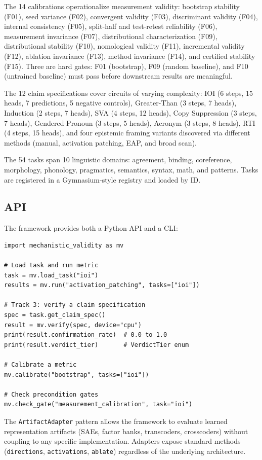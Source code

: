 \documentclass[10pt]{article}
\begin{document}
The 14 calibrations operationalize measurement validity: bootstrap stability (F01), seed variance (F02), convergent validity (F03), discriminant validity (F04), internal consistency (F05), split-half and test-retest reliability (F06), measurement invariance (F07), distributional characterization (F09), distributional stability (F10), nomological validity (F11), incremental validity (F12), ablation invariance (F13), method invariance (F14), and certified stability (F15). Three are hard gates: F01 (bootstrap), F09 (random baseline), and F10 (untrained baseline) must pass before downstream results are meaningful.

The 12 claim specifications cover circuits of varying complexity: IOI (6 steps, 15 heads, 7 predictions, 5 negative controls), Greater-Than (3 steps, 7 heads), Induction (2 steps, 7 heads), SVA (4 steps, 12 heads), Copy Suppression (3 steps, 7 heads), Gendered Pronoun (3 steps, 5 heads), Acronym (3 steps, 8 heads), RTI (4 steps, 15 heads), and four epistemic framing variants discovered via different methods (manual, activation patching, EAP, and broad scan).

The 54 tasks span 10 linguistic domains: agreement, binding, coreference, morphology, phonology, pragmatics, semantics, syntax, math, and patterns. Tasks are registered in a Gymnasium-style registry and loaded by ID.

\subsection{API}
\label{sec:api}

The framework provides both a Python API and a CLI:

\begin{verbatim}
import mechanistic_validity as mv

# Load task and run metric
task = mv.load_task("ioi")
results = mv.run("activation_patching", tasks=["ioi"])

# Track 3: verify a claim specification
spec = task.get_claim_spec()
result = mv.verify(spec, device="cpu")
print(result.confirmation_rate)  # 0.0 to 1.0
print(result.verdict_tier)       # VerdictTier enum

# Calibrate a metric
mv.calibrate("bootstrap", tasks=["ioi"])

# Check precondition gates
mv.check_gate("measurement_calibration", task="ioi")
\end{verbatim}

The \texttt{ArtifactAdapter} pattern allows the framework to evaluate learned representation artifacts (SAEs, factor banks, transcoders, crosscoders) without coupling to any specific implementation. Adapters expose standard methods (\texttt{directions}, \texttt{activations}, \texttt{ablate}) regardless of the underlying architecture.
\end{document}
